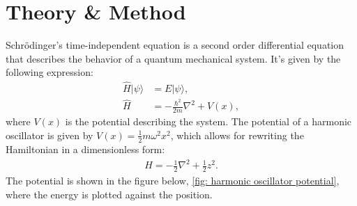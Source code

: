 \documentclass[a4paper]{article}
\newcommand{\w}{\omega}
\newcommand{\laplace}{\nabla^2}
\newcommand{\ket}[1]{|#1\rangle}
\begin{document}
\newpage
\section{Theory \& Method}
Schrödinger's time-independent equation is a second order differential equation that describes the behavior of a quantum mechanical system.
It's given by the following expression:
\begin{align}
    \hat{H}\ket{\psi} &= E\ket{\psi},\label{eq: schrödinger}\\
    \hat{H} &= -\frac{\hbar^2}{2m}\laplace + V(x),\nonumber
\end{align}where $V(x)$ is the potential describing the system. The potential of a harmonic oscillator is given by $V(x) = \frac{1}{2}m\w^2x^2$,
which allows for rewriting the Hamiltonian in a dimensionless form:
\begin{align*}
    \hat{H} = -\frac{1}{2}\laplace + \frac{1}{2}z^2.
\end{align*}The potential is shown in the figure below, \ref{fig: harmonic oscillator potential}, where the energy is plotted against the position.
\end{document}
